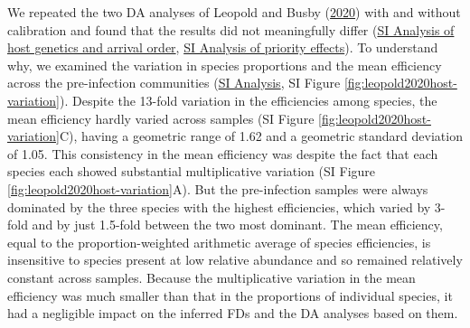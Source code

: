\documentclass[
]{article}
\begin{document}
We repeated the two DA analyses of Leopold and Busby (\protect\hyperlink{ref-leopold2020host}{2020}) with and without calibration and found that the results did not meaningfully differ
(\href{https://mikemc.github.io/differential-abundance-theory/notebook/posts/2022-01-06-leopold2020host-original-regression-analysis/}{SI Analysis of host genetics and arrival order},
\href{https://mikemc.github.io/differential-abundance-theory/notebook/posts/2022-01-05-leopold2020host-priority-effects/}{SI Analysis of priority effects}).
To understand why, we examined the variation in species proportions and the mean efficiency across the pre-infection communities
(\href{https://mikemc.github.io/differential-abundance-theory/notebook/posts/2022-01-08-leopold2020host-case-study/}{SI Analysis},
SI Figure \ref{fig:leopold2020host-variation}).
Despite the 13-fold variation in the efficiencies among species, the mean efficiency hardly varied across samples (SI Figure \ref{fig:leopold2020host-variation}C), having a geometric range of 1.62 and a geometric standard deviation of 1.05.
This consistency in the mean efficiency was despite the fact that each species each showed substantial multiplicative variation (SI Figure \ref{fig:leopold2020host-variation}A).
But the pre-infection samples were always dominated by the three species with the highest efficiencies, which varied by 3-fold and by just 1.5-fold between the two most dominant.
The mean efficiency, equal to the proportion-weighted arithmetic average of species efficiencies, is insensitive to species present at low relative abundance and so remained relatively constant across samples.
Because the multiplicative variation in the mean efficiency was much smaller than that in the proportions of individual species, it had a negligible impact on the inferred FDs and the DA analyses based on them.
\end{document}
